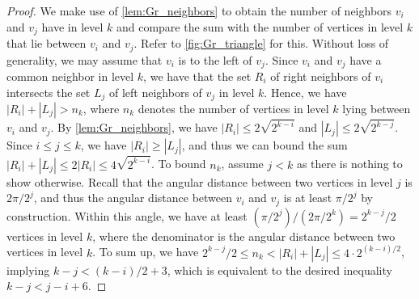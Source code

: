 \begin{proof}
    We make use of \cref{lem:Gr_neighbors} to obtain the number of neighbors $ v_i $ and $ v_j $ have in level $ k $ and compare the sum with the number of vertices in level $ k $ that lie between $ v_i $ and $ v_j $.
    Refer to \cref{fig:Gr_triangle} for this.
    Without loss of generality, we may assume that $ v_i $ is to the left of $ v_j $.
    Since $ v_i $ and $ v_j $ have a common neighbor in level $ k $, we have that the set $R_i$ of right neighbors of $ v_i $ intersects the set $L_j$ of left neighbors of $ v_j $ in level $ k $.
    Hence, we have $ |R_i| + |L_j| > n_k $, where $n_k$ denotes the number of vertices in level $ k $ lying between $ v_i $ and $ v_j $.
%
    By \cref{lem:Gr_neighbors}, we have $ |R_i| \leq 2 \sqrt{2^{k-i}} $ and $ |L_j| \leq 2 \sqrt{2^{k-j}} $.
    Since $ i \leq j \leq k $, we have $ |R_i| \geq |L_j| $, and thus we can bound the sum $ |R_i| + |L_j| \leq 2 |R_i| \leq 4 \sqrt{2^{k-i}} $.
%
    To bound $ n_k $, assume $ j < k $ as there is nothing to show otherwise.
    Recall that the angular distance between two vertices in level $ j $ is $ 2\pi / 2^j $, and thus the angular distance between $ v_i $ and $ v_j $ is at least $ \pi / 2^j $ by construction.
    Within this angle, we have at least $ (\pi / 2^j) / (2\pi / 2^k) = 2^{k-j}/2 $ vertices in level $ k $, where the denominator is the angular distance between two vertices in level $ k $.
%
    To sum up, we have 
    $ 2^{k-j}/2 \leq n_k < |R_i| + |L_j| \leq 4 \cdot 2^{(k-i)/2} $,
    implying $ k - j < (k - i)/2 + 3 $, which is equivalent to the desired inequality $ k - j < j - i + 6 $.
\end{proof}
%
%
